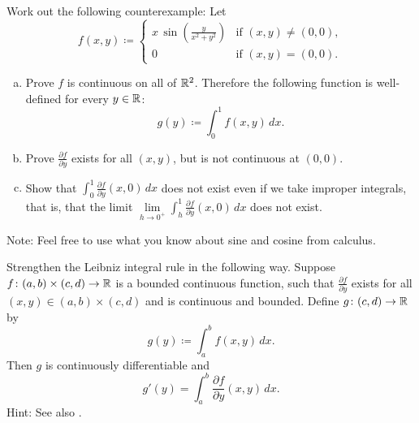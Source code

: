\begin{exercise}
\pagebreak[2]
Work out the following counterexample:  Let
\begin{equation*}
f(x,y) \coloneqq
\begin{cases}
x \,\sin \left(\frac{y}{x^2+y^2}\right) & \text{if } (x,y) \not= (0,0),\\
0                                       & \text{if } (x,y)=(0,0).
\end{cases}
\end{equation*}
\begin{enumerate}[a)]
\item
Prove $f$ is continuous on all of ${\mathbb{R}}^2$.
Therefore the following function is well-defined for every $y \in {\mathbb{R}}$:
\begin{equation*}
g(y) \coloneqq \int_0^1 f(x,y) \, dx .
\end{equation*}
\item
Prove $\frac{\partial f}{\partial y}$ exists for all $(x,y)$,
but is not continuous at $(0,0)$.
\item
Show that $\int_0^1 \frac{\partial f}{\partial y}(x,0) \, dx$ does not
exist even if we take improper integrals, that is,
that the limit
$\lim\limits_{h \to 0^+} \int_h^1 \frac{\partial f}{\partial y}(x,0) \, dx$
does not exist.
\end{enumerate}
Note: Feel free to use what you know about sine and cosine from calculus.
\end{exercise}

\begin{exercise} \label{exercise:strongerleibniz}
\pagebreak[3]
Strengthen the Leibniz integral rule in the following way.
Suppose $f \colon (a,b) \times (c,d) \to {\mathbb{R}}$ is a bounded continuous function,
such that $\frac{\partial f}{\partial y}$ exists for all $(x,y) \in (a,b)
\times (c,d)$ and is continuous and bounded.  Define $g \colon (c,d) \to {\mathbb{R}}$
by
\begin{equation*}
g(y) \coloneqq \int_a^b f(x,y) \,dx .
\end{equation*}
Then $g$ is continuously differentiable and
\begin{equation*}
g'(y) = \int_a^b \frac{\partial f}{\partial y}(x,y) \,dx .
\end{equation*}
Hint: See also .
\end{exercise}

